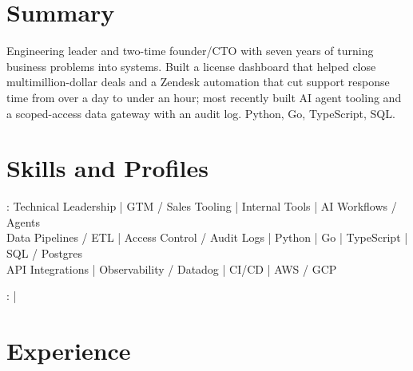\documentclass[print]{jack-resume}
\begin{document}
\pagecolor{darkmodeBackground}


\begin{minipage}[t][1cm][t]{.03\textwidth}
    \hfill
\end{minipage}

\section{Summary}
Engineering leader and two-time founder/CTO with seven years of turning business problems into systems. Built a license dashboard that helped close multimillion-dollar deals and a Zendesk automation that cut support response time from over a day to under an hour; most recently built AI agent tooling and a scoped-access data gateway with an audit log. Python, Go, TypeScript, SQL.
\sectionsep

\section{Skills and Profiles}
:
Technical Leadership \hfill | \hfill
GTM / Sales Tooling \hfill | \hfill
Internal Tools \hfill | \hfill
AI Workflows / Agents \\
\hspace{1.0cm} Data Pipelines / ETL \hfill | \hfill
Access Control / Audit Logs \hfill | \hfill
Python \hfill | \hfill
Go \hfill | \hfill
TypeScript \hfill | \hfill
SQL / Postgres \\
\hspace{1.0cm} API Integrations \hfill | \hfill
Observability / Datadog \hfill | \hfill
CI/CD \hfill | \hfill
AWS / GCP \\

\raggedright{
    :
      \href{https://www.linkedin.com/in/jack-sturtevant/}{ \ExternalLink} |
     \href{https://github.com/jacksturt}{ \ExternalLink}}

\section{Experience}
\end{document}
